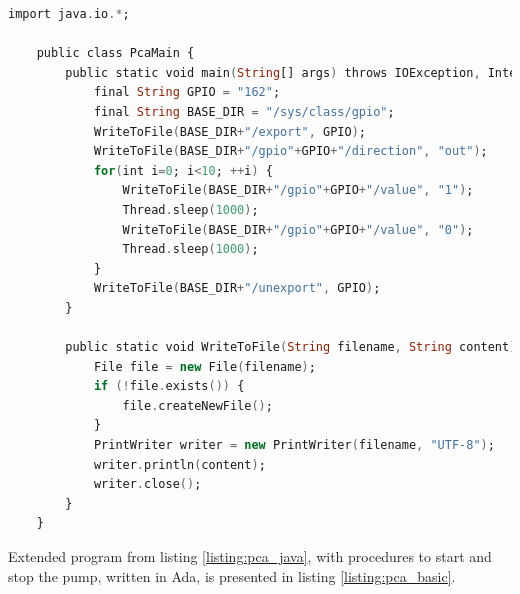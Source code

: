 \begin{lstlisting}[language=ada, frame=single, gobble=0, caption={Turning pin on and off}]
	import java.io.*;

	public class PcaMain {
		public static void main(String[] args) throws IOException, InterruptedException {
			final String GPIO = "162";
			final String BASE_DIR = "/sys/class/gpio";			
			WriteToFile(BASE_DIR+"/export", GPIO);
			WriteToFile(BASE_DIR+"/gpio"+GPIO+"/direction", "out");			
			for(int i=0; i<10; ++i) {
	            WriteToFile(BASE_DIR+"/gpio"+GPIO+"/value", "1");
	            Thread.sleep(1000);
				WriteToFile(BASE_DIR+"/gpio"+GPIO+"/value", "0");
	            Thread.sleep(1000);
			}			
			WriteToFile(BASE_DIR+"/unexport", GPIO);
		}
		
		public static void WriteToFile(String filename, String content) throws IOException {
			File file = new File(filename);			 
			if (!file.exists()) {
				file.createNewFile();
			}
			PrintWriter writer = new PrintWriter(filename, "UTF-8");
			writer.println(content);
			writer.close();
		}
	}
\end{lstlisting} 
\label{listing:pca_java}

Extended program from listing \ref{listing:pca_java}, with procedures to start and stop the pump, written in Ada, is presented in listing \ref{listing:pca_basic}.

